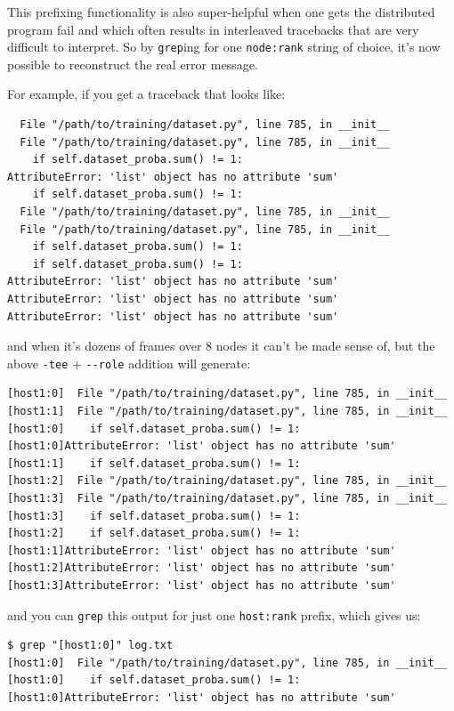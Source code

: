 \documentclass[
]{report}
\begin{document}
This prefixing functionality is also super-helpful when one gets the
distributed program fail and which often results in interleaved
tracebacks that are very difficult to interpret. So by \texttt{grep}ing
for one \texttt{node:rank} string of choice, it's now possible to
reconstruct the real error message.

For example, if you get a traceback that looks like:

\begin{verbatim}
  File "/path/to/training/dataset.py", line 785, in __init__
  File "/path/to/training/dataset.py", line 785, in __init__
    if self.dataset_proba.sum() != 1:
AttributeError: 'list' object has no attribute 'sum'
    if self.dataset_proba.sum() != 1:
  File "/path/to/training/dataset.py", line 785, in __init__
  File "/path/to/training/dataset.py", line 785, in __init__
    if self.dataset_proba.sum() != 1:
    if self.dataset_proba.sum() != 1:
AttributeError: 'list' object has no attribute 'sum'
AttributeError: 'list' object has no attribute 'sum'
AttributeError: 'list' object has no attribute 'sum'
\end{verbatim}

and when it's dozens of frames over 8 nodes it can't be made sense of,
but the above \texttt{-tee} + \texttt{-\/-role} addition will generate:

\begin{verbatim}
[host1:0]  File "/path/to/training/dataset.py", line 785, in __init__
[host1:1]  File "/path/to/training/dataset.py", line 785, in __init__
[host1:0]    if self.dataset_proba.sum() != 1:
[host1:0]AttributeError: 'list' object has no attribute 'sum'
[host1:1]    if self.dataset_proba.sum() != 1:
[host1:2]  File "/path/to/training/dataset.py", line 785, in __init__
[host1:3]  File "/path/to/training/dataset.py", line 785, in __init__
[host1:3]    if self.dataset_proba.sum() != 1:
[host1:2]    if self.dataset_proba.sum() != 1:
[host1:1]AttributeError: 'list' object has no attribute 'sum'
[host1:2]AttributeError: 'list' object has no attribute 'sum'
[host1:3]AttributeError: 'list' object has no attribute 'sum'
\end{verbatim}

and you can \texttt{grep} this output for just one \texttt{host:rank}
prefix, which gives us:

\begin{verbatim}
$ grep "[host1:0]" log.txt
[host1:0]  File "/path/to/training/dataset.py", line 785, in __init__
[host1:0]    if self.dataset_proba.sum() != 1:
[host1:0]AttributeError: 'list' object has no attribute 'sum'
\end{verbatim}
\end{document}
